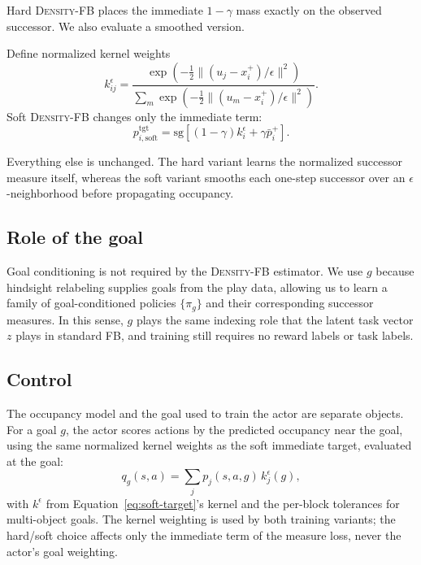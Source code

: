 \documentclass{article}
\newcommand{\sg}{\mathrm{sg}}
\newcommand{\DensityFB}{\textsc{Density-FB}}
\begin{document}
Hard \DensityFB{} places the immediate $1-\gamma$ mass exactly on the observed successor.
We also evaluate a smoothed version.

Define normalized kernel weights
\begin{equation}
k_{ij}^{\epsilon} = \frac{ \exp\!\left( -\frac12 \|(u_j-x_i^+)/\epsilon\|^2 \right)}{ \sum_m \exp\!\left( -\frac12 \|(u_m-x_i^+)/\epsilon\|^2 \right)
}.
\end{equation}
Soft \DensityFB{} changes only the immediate term:
\begin{equation}
\label{eq:soft-target}
    p_{i,\mathrm{soft}}^{\mathrm{tgt}} = \sg\left[ (1-\gamma)k_i^\epsilon + \gamma\bar p_i^+\right].
\end{equation}

Everything else is unchanged.
The hard variant learns the normalized successor measure itself, whereas the soft variant smooths each one-step successor over an $\epsilon$-neighborhood before propagating occupancy.

\subsection{Role of the goal}

Goal conditioning is not required by the \DensityFB{} estimator.
We use $g$ because hindsight relabeling supplies goals from the play data, allowing us to learn a family of goal-conditioned policies $\{\pi_g\}$ and their corresponding successor measures.
In this sense, $g$ plays the same indexing role that the latent task vector $z$ plays in standard FB, and training still requires no reward labels or task labels.

\subsection{Control}

The occupancy model and the goal used to train the actor are separate objects.
For a goal $g$, the actor scores actions by the predicted occupancy near the goal, using the same normalized kernel weights as the soft immediate target, evaluated at the goal:
\begin{equation}
\label{eq:goal-readout}
q_g(s,a)
=
\sum_j
p_j(s,a,g)\,
k_j^\epsilon(g),
\end{equation}
with $k^\epsilon$ from Equation~\ref{eq:soft-target}'s kernel and the per-block tolerances for multi-object goals.
The kernel weighting is used by both training variants; the hard/soft choice affects only the immediate term of the measure loss, never the actor's goal weighting.
\end{document}
